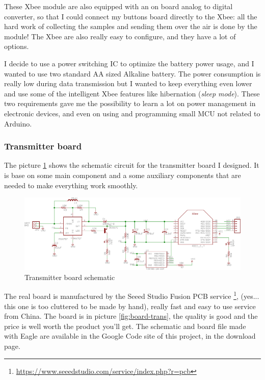 \documentclass[11pt,english]{article}
\begin{document}
These Xbee module are also equipped with an on board analog to digital converter, so that I could connect my buttons 
board directly to the Xbee: all the hard work of collecting the samples and sending them over the air is done by the 
module! The Xbee are also really easy to configure, and they have a lot of options.

I decide to use a power switching IC to optimize the battery power usage, and I wanted to use two standard AA sized
Alkaline battery. The power consumption is really low during data transmission but I wanted to keep everything even 
lower and use some of the intelligent Xbee features like hibernation (\emph{sleep mode}). These two requirements gave 
me the possibility to learn a lot on power management in electronic devices, and even on using and programming small
MCU not related to Arduino. 

\subsubsection{Transmitter board}\label{subsec:hd-wireless_trans}

The picture \ref{fig:board-trans-sch} shows the schematic circuit for the transmitter board I designed. It is base on some main 
component and a some auxiliary components that are needed to make everything work smoothly.

%
\begin{figure}[htb]
\centering\includegraphics[scale=0.65]{img/Transmitter}

\caption{Transmitter board schematic \label{fig:board-trans-sch}}

\end{figure}

The real board is manufactured by the Seeed Studio Fusion PCB service \footnote{\url{https://www.seeedstudio.com/service/index.php?r=pcb}}, (yes... this one is too cluttered to be made by hand),  
really fast and easy to use service from China. The board is in picture \ref{fig:board-trans}, the quality is good and 
the price is well worth the product you'll get.
The schematic and board file made with Eagle are available in the Google Code site of this project, in the download page. 
\end{document}
